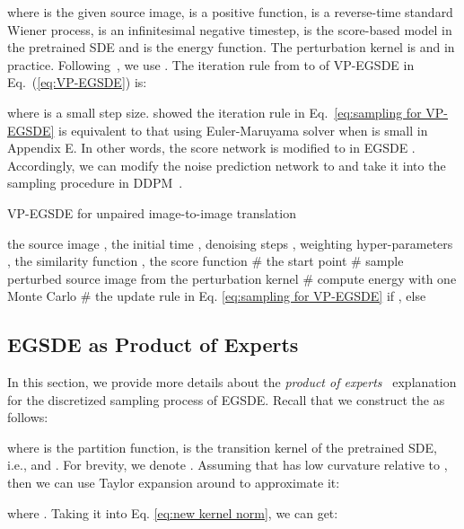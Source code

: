 \documentclass{article}
\begin{document}
where  is the given source image,  is a positive function,  is a reverse-time standard Wiener process,  is an infinitesimal negative timestep,  is the score-based model in the pretrained SDE and  is the energy function. The perturbation kernel  is  and  in practice. Following~\cite{meng2021sdedit,ho2020denoising}, we use . The iteration rule from  to  of VP-EGSDE in Eq.~(\ref{eq:VP-EGSDE}) is:

where  is a small step size. \cite{song2020score} showed the iteration rule in Eq.~\eqref{eq:sampling for VP-EGSDE}  is equivalent to that using Euler-Maruyama solver when  is small in Appendix E. In other words, the score network is modified to  in EGSDE . Accordingly, we can modify the noise prediction network to  and take it into the sampling procedure in DDPM~\cite{ho2020denoising}. 

\begin{algorithm}
    \caption{VP-EGSDE for unpaired image-to-image translation}
    \label{alg:VP-EGSDE}
    \begin{algorithmic}
        \REQUIRE the source image , the initial time , denoising steps , weighting hyper-parameters , the similarity function , the score function  
        \STATE  \# the start point
        \STATE 
        \STATE 
        \STATE  \# sample perturbed source image from the perturbation kernel
        \STATE  \# compute energy with one Monte Carlo
        \STATE  \# the update rule in Eq. \eqref{eq:sampling for VP-EGSDE}
        \STATE  if , else 
        \STATE 
    \ENDFOR
    \STATE 
    \RETURN 
    \end{algorithmic}
\end{algorithm}



\subsection{EGSDE as Product of Experts}
\label{sec:products}
In this section, we provide more details about the \emph{product of experts}~\cite{hinton2002training} explanation for the discretized sampling process of EGSDE. Recall that we construct the  as follows:

where  is the partition function,  is the transition kernel of the pretrained SDE, i.e.,  and . For brevity, we denote .  Assuming that  has low curvature relative to , then we can use Taylor expansion around  to approximate it: 

where . Taking it into Eq. \eqref{eq:new kernel norm}, we can get:
\end{document}
